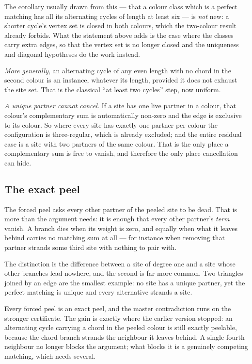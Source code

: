 \documentclass[11pt]{article}
\theoremstyle{definition}
\theoremstyle{remark}
\begin{document}
The corollary usually drawn from this --- that a colour class which is a perfect matching
has all its alternating cycles of length at least six --- is \emph{not} new: a shorter
cycle's vertex set is closed in both colours, which the two-colour result already forbids.
What the statement above adds is the case where the classes carry extra edges, so that the
vertex set is no longer closed and the uniqueness and diagonal hypotheses do the work
instead.

\emph{More generally}, an alternating cycle of any even length with no chord in the
second colour is an instance, whatever its length, provided it does not exhaust the
site set. That is the classical ``at least two cycles'' step, now uniform.

\emph{A unique partner cannot cancel.} If a site has one live partner in a colour, that
colour's complementary sum is automatically non-zero and the edge is exclusive to its
colour. So where every site has exactly one partner per colour the configuration is
three-regular, which is already excluded; and the entire residual case is a site with
two partners of the same colour. That is the only place a complementary sum is free to
vanish, and therefore the only place cancellation can hide.

\subsection*{The exact peel}

The forced peel asks every other partner of the peeled site to be dead. That is more than
the argument needs: it is enough that every other partner's \emph{term} vanish. A branch
dies when its weight is zero, and equally when what it leaves behind carries no matching
sum at all --- for instance when removing that partner strands some third site with
nothing to pair with.

The distinction is the difference between a site of degree one and a site whose other
branches lead nowhere, and the second is far more common. Two triangles joined by an edge
are the smallest example: no site has a unique partner, yet the perfect matching is
unique and every alternative strands a site.

Every forced peel is an exact peel, and the master contradiction runs on the stronger
certificate. The gain is exactly where the earlier version stopped: an alternating cycle
carrying a chord in the peeled colour is still exactly peelable, because the chord branch
strands the neighbour it leaves behind. A single fourth neighbour no longer blocks the
argument; what blocks it is a genuinely competing matching, which needs several.
\end{document}
